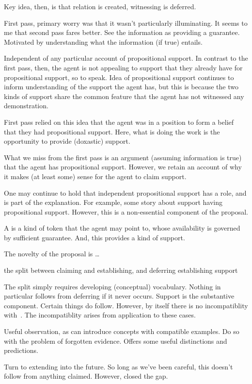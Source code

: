 \begin{note}
  Key idea, then, is that relation is created, witnessing is deferred.

  First pass, primary worry was that it wasn't particularly illuminating.
  It seems to me that second pass fares better.
  See the information as providing a guarantee.
  Motivated by understanding what the information (if true) entails.

  Independent of any particular account of propositional support.
  In contrast to the first pass, then, the agent is not appealing to support that they already have for propositional support, so to speak.
  Idea of propositional support continues to inform understanding of the support the agent has, but this is because the two kinds of support share the common feature that the agent has not witnessed any demonstration.

  First pass relied on this idea that the agent was in a position to form a belief that they had propositional support.
  Here, what is doing the work is the opportunity to provide (doxastic) support.

  What we miss from the first pass is an argument (assuming information is true) that the agent has propositional support.
  However, we retain an account of why it makes (at least some) sense for the agent to claim support.

  One may continue to hold that independent propositional support has a role, and is part of the explanation.
  For example, some story about support having propositional support.
  However, this is a non-essential component of the proposal.

  A \future{} is a kind of token that the agent may point to, whose availability is governed by sufficient guarantee.
  And, this provides a kind of support.
\end{note}

\begin{note}[Novelty]
  The novelty of the proposal is \dots

  the split between claiming and establishing, and deferring establishing
  support

  The split simply requires developing (conceptual) vocabulary.
  Nothing in particular follows from deferring if it never occurs.
  Support is the substantive component.
  Certain things do follow.
  However, by itself there is no incompatiblity with~\uRa{}.
  The incompatiblity arises from application to these cases.

  Useful observation, as can introduce concepts with compatible examples.
  Do so with the problem of forgotten evidence.
  Offers some useful distinctions and predictions.

  Turn to extending into the future.
  So long as we've been careful, this doesn't follow from anything claimed.
  However, closed the gap.
\end{note}

